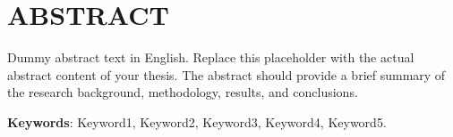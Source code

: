 \chapter*{ABSTRACT}

Dummy abstract text in English. Replace this placeholder with the actual abstract content of your thesis. The abstract should provide a brief summary of the research background, methodology, results, and conclusions.

\vspace{0.3cm}

\noindent
\textbf{Keywords}: Keyword1, Keyword2, Keyword3, Keyword4, Keyword5.